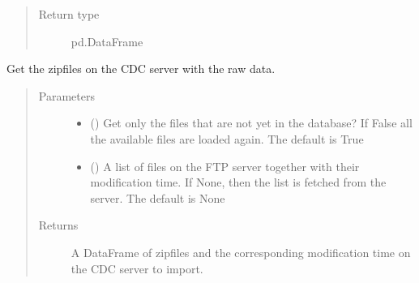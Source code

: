 \documentclass[letterpaper,10pt,english]{sphinxmanual}
\begin{document}
\begin{fulllineitems}
\begin{fulllineitems}
\begin{quote}
\begin{description}
\item[{Return type}] \leavevmode
\sphinxAtStartPar
pd.DataFrame

\end{description}\end{quote}

\end{fulllineitems}


\begin{fulllineitems}
\label{\detokenize{weatherDB:weatherDB.station.StationBase.get_zipfiles}}
\sphinxAtStartPar
Get the zipfiles on the CDC server with the raw data.
\begin{quote}\begin{description}
\item[{Parameters}] \leavevmode\begin{itemize}
\item {} 
\sphinxAtStartPar
{} (\sphinxstyleliteralemphasis{\sphinxupquote{, }}) \textendash{} Get only the files that are not yet in the database?
If False all the available files are loaded again.
The default is True

\item {} 
\sphinxAtStartPar
{} (\sphinxstyleliteralemphasis{\sphinxupquote{ (}}\sphinxstyleliteralemphasis{\sphinxupquote{, }}\sphinxstyleliteralemphasis{\sphinxupquote{)}}\sphinxstyleliteralemphasis{\sphinxupquote{, }}) \textendash{} A list of files on the FTP server together with their modification time.
If None, then the list is fetched from the server.
The default is None

\end{itemize}

\item[{Returns}] \leavevmode
\sphinxAtStartPar
A DataFrame of zipfiles and the corresponding modification time on the CDC server to import.


\end{description}
\end{quote}
\end{fulllineitems}
\end{fulllineitems}
\end{document}
